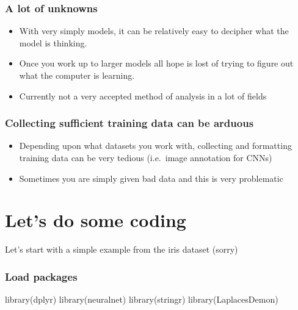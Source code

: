 \documentclass[
]{article}
\newenvironment{Shaded}{\begin{snugshade}}{\end{snugshade}}
\newcommand{\FunctionTok}[1]{\textcolor[rgb]{0.00,0.00,0.00}{#1}}
\newcommand{\NormalTok}[1]{#1}
\providecommand{\tightlist}{%
  \setlength{\itemsep}{0pt}\setlength{\parskip}{0pt}}
\begin{document}
\hypertarget{a-lot-of-unknowns}{%
\subsubsection{A lot of unknowns}\label{a-lot-of-unknowns}}

\begin{itemize}
\tightlist
\item
  With very simply models, it can be relatively easy to decipher what
  the model is thinking.
\item
  Once you work up to larger models all hope is lost of trying to figure
  out what the computer is learning.
\item
  Currently not a very accepted method of analysis in a lot of fields
\end{itemize}

\hypertarget{collecting-sufficient-training-data-can-be-arduous}{%
\subsubsection{Collecting sufficient training data can be
arduous}\label{collecting-sufficient-training-data-can-be-arduous}}

\begin{itemize}
\tightlist
\item
  Depending upon what datasets you work with, collecting and formatting
  training data can be very tedious (i.e.~image annotation for CNNs)
\item
  Sometimes you are simply given bad data and this is very problematic
\end{itemize}

\hypertarget{lets-do-some-coding}{%
\section{Let's do some coding}\label{lets-do-some-coding}}

Let's start with a simple example from the iris dataset (sorry)

\hypertarget{load-packages}{%
\subsubsection{Load packages}\label{load-packages}}

\begin{Shaded}
\begin{Highlighting}[]
\FunctionTok{library}\NormalTok{(dplyr)}
\FunctionTok{library}\NormalTok{(neuralnet)}
\FunctionTok{library}\NormalTok{(stringr)}
\FunctionTok{library}\NormalTok{(LaplacesDemon)}
\end{Highlighting}
\end{Shaded}
\end{document}
